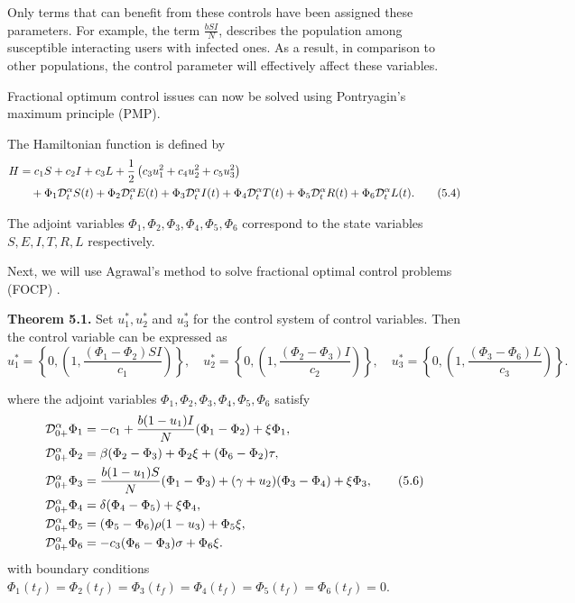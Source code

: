 \documentclass[10pt]{NSP1}
\newcommand{\CD}{\mathcal{D}}
\begin{document}
	Only terms that can benefit from these controls have been assigned these parameters. For example, the term $\frac{b S I}{N}$, describes the population among susceptible interacting users with infected ones. As a result, in comparison to other populations, the control parameter will effectively affect these variables.
	
	Fractional optimum control issues can now be solved using Pontryagin's maximum principle (PMP).
	
	The Hamiltonian function is defined by
	\begin{align}
		H &= c_1 S + c_2 I + c_3 L + \frac{1}{2} \left( c_3 u_1^2 + c_4 u_2^2 + c_5 u_3^2 \right) \notag \\
		&\quad + \Phi_1 \CD_t^\alpha S(t) + \Phi_2 \CD_t^\alpha E(t) + \Phi_3 \CD_t^\alpha I(t) + \Phi_4 \CD_t^\alpha T(t) + \Phi_5 \CD_t^\alpha R(t) + \Phi_6 \CD_t^\alpha L(t).
		\tag{5.4}
	\end{align}
	
	The adjoint variables $\Phi_1, \Phi_2, \Phi_3, \Phi_4, \Phi_5, \Phi_6$ correspond to the state variables $S, E, I, T, R, L$ respectively.
	
	Next, we will use Agrawal's method to solve fractional optimal control problems (FOCP) \cite{ref38}.
	
	\textbf{Theorem 5.1.} Set $u_1^\ast, u_2^\ast$ and $u_3^\ast$ for the control system of control variables. Then the control variable can be expressed as
	\begin{equation}
		u_1^\ast = \left\{ 0, \left( 1, \frac{(\Phi_1 - \Phi_2) S I}{c_1} \right) \right\}, \quad
		u_2^\ast = \left\{ 0, \left( 1, \frac{(\Phi_2 - \Phi_3) I}{c_2} \right) \right\}, \quad
		u_3^\ast = \left\{ 0, \left( 1, \frac{(\Phi_3 - \Phi_6) L}{c_3} \right) \right\}.
		\tag{5.5}
	\end{equation}
	
	where the adjoint variables $\Phi_1, \Phi_2, \Phi_3, \Phi_4, \Phi_5, \Phi_6$ satisfy
	\begin{align}
		\CD_{0+}^{\alpha} \Phi_1 &= -c_1 + \frac{b (1-u_1) I}{N} (\Phi_1 - \Phi_2) + \xi \Phi_1, \notag \\
		\CD_{0+}^{\alpha} \Phi_2 &= \beta(\Phi_2 - \Phi_3) + \Phi_2 \xi + (\Phi_6 - \Phi_2) \tau, \notag \\
		\CD_{0+}^{\alpha} \Phi_3 &= \frac{b (1-u_1) S}{N} (\Phi_1 - \Phi_3) + (\gamma + u_2)(\Phi_3 - \Phi_4) + \xi \Phi_3, \tag{5.6} \\
		\CD_{0+}^{\alpha} \Phi_4 &= \delta(\Phi_4 - \Phi_5) + \xi \Phi_4, \notag \\
		\CD_{0+}^{\alpha} \Phi_5 &= (\Phi_5 - \Phi_6) \rho (1-u_3) + \Phi_5 \xi, \notag \\
		\CD_{0+}^{\alpha} \Phi_6 &= -c_3 (\Phi_6 - \Phi_3) \sigma + \Phi_6 \xi. \notag
	\end{align}
	with boundary conditions $\Phi_1(t_f) = \Phi_2(t_f) = \Phi_3(t_f) = \Phi_4(t_f) = \Phi_5(t_f) = \Phi_6(t_f) = 0$.
	
\end{document}
